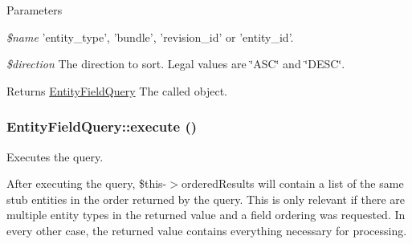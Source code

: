 \begin{DoxyParams}{Parameters}
\item[{\em \$name}]'entity\_\-type', 'bundle', 'revision\_\-id' or 'entity\_\-id'. \item[{\em \$direction}]The direction to sort. Legal values are \char`\"{}ASC\char`\"{} and \char`\"{}DESC\char`\"{}.\end{DoxyParams}
\begin{DoxyReturn}{Returns}
\hyperlink{classEntityFieldQuery}{EntityFieldQuery} The called object. 
\end{DoxyReturn}
\hypertarget{classEntityFieldQuery_ac90614418d7fb3a0c81134889fe1bcbd}{
\subsubsection[{execute}]{\setlength{\rightskip}{0pt plus 5cm}EntityFieldQuery::execute ()}}
\label{classEntityFieldQuery_ac90614418d7fb3a0c81134889fe1bcbd}
Executes the query.

After executing the query, \$this-\/$>$orderedResults will contain a list of the same stub entities in the order returned by the query. This is only relevant if there are multiple entity types in the returned value and a field ordering was requested. In every other case, the returned value contains everything necessary for processing.

